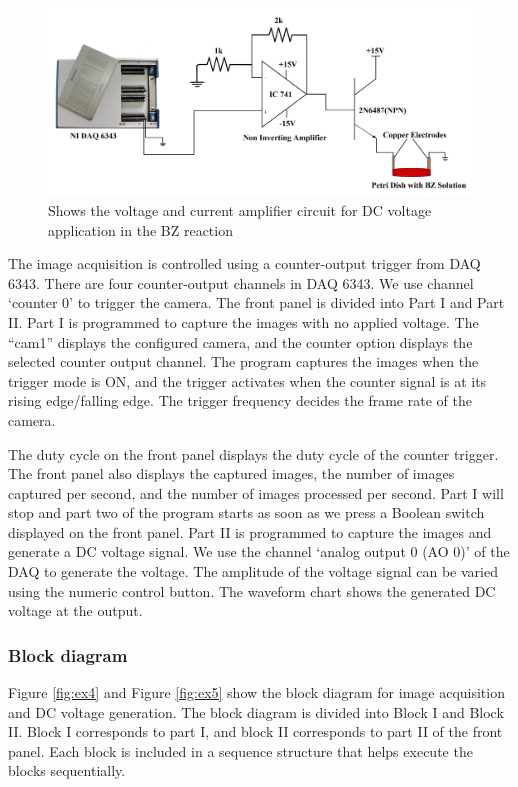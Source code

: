 \documentclass[journal=jacsat,manuscript=article]{achemso}
\begin{document}
\begin{figure}[H]
    \centering
    \includegraphics[width=\linewidth]{pulse circuit - Copy.jpg}
    \caption{Shows the voltage and current amplifier circuit for DC
      voltage application in the BZ reaction}
    \label{fig:ex2}
\end{figure}


The image acquisition is controlled using a counter-output trigger
from DAQ 6343. There are four counter-output channels in DAQ 6343. We
use channel ‘counter 0’ to trigger the camera. The front panel is
divided into Part I and Part II. Part I is programmed to capture the
images with no applied voltage. The “cam1” displays the configured
camera, and the counter option displays the selected counter output
channel. The program captures the images when the trigger mode is ON,
and the trigger activates when the counter signal is at its rising
edge/falling edge. The trigger frequency decides the frame rate of the
camera.

The duty cycle on the front panel displays the duty cycle of the
counter trigger. The front panel also displays the captured images,
the number of images captured per second, and the number of images
processed per second. Part I will stop and part two of the program
starts as soon as we press a Boolean switch displayed on the front
panel. Part II is programmed to capture the images and generate a DC
voltage signal. We use the channel ‘analog output 0 (AO 0)’ of the DAQ
to generate the voltage. The amplitude of the voltage signal can be
varied using the numeric control button. The waveform chart shows the
generated DC voltage at the output.
\subsubsection{Block diagram}
Figure \ref{fig:ex4} and Figure \ref{fig:ex5} show the block diagram
for image acquisition and DC voltage generation. The block diagram is
divided into Block I and Block II. Block I corresponds to part I, and
block II corresponds to part II of the front panel. Each block is
included in a sequence structure that helps execute the blocks sequentially.
 
\end{document}

